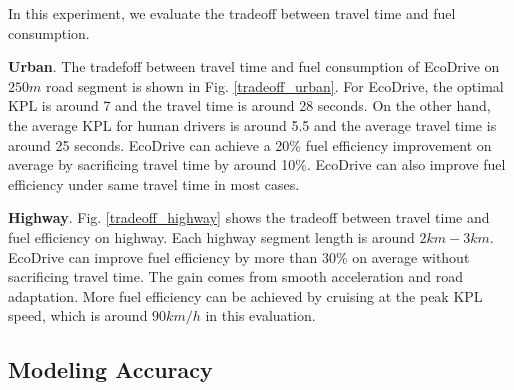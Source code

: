 In this experiment, we evaluate the tradeoff between travel time and fuel consumption. 

\textbf{Urban}. 
The tradefoff between travel time and fuel consumption of EcoDrive on $250m$ 
road segment is shown in Fig. \ref{tradeoff_urban}. For EcoDrive, the optimal KPL is around 7 and the 
travel time is around 28 seconds. On the other hand, the average KPL for human 
drivers is around 5.5 and the average travel time is around 25 seconds. 
EcoDrive can achieve a 20\% fuel efficiency improvement 
on average by sacrificing travel time by around 10\%. 
EcoDrive can also improve fuel efficiency under same travel time in most cases. 

\textbf{Highway}.  
Fig. \ref{tradeoff_highway} shows the tradeoff between travel time and fuel efficiency on highway. 
Each highway segment length is around $2km-3km$. 
EcoDrive can improve fuel efficiency by more than 30\% on average without sacrificing travel time.    
The gain comes from smooth acceleration and road adaptation. 
More fuel efficiency can be achieved by cruising at the peak KPL speed, 
which is around $90km/h$ in this evaluation. 

\subsection{Modeling Accuracy}


